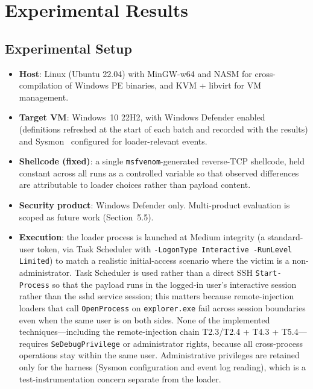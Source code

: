 \section{Experimental Results}

\subsection{Experimental Setup}

\begin{itemize}[leftmargin=*, itemsep=1pt]
    \item \textbf{Host}: Linux (Ubuntu 22.04) with MinGW-w64 and NASM for cross-compilation of Windows PE binaries, and KVM + libvirt for VM management.
    \item \textbf{Target VM}: Windows~10 22H2, with Windows Defender enabled (definitions refreshed at the start of each batch and recorded with the results) and Sysmon~\cite{sysmon} configured for loader-relevant events.
    \item \textbf{Shellcode (fixed)}: a single \texttt{msfvenom}-generated reverse-TCP shellcode, held constant across all runs as a controlled variable so that observed differences are attributable to loader choices rather than payload content.
    \item \textbf{Security product}: Windows Defender only. Multi-product evaluation is scoped as future work (Section~5.5).
    \item \textbf{Execution}: the loader process is launched at Medium integrity (a standard-user token, via Task Scheduler with \texttt{-LogonType Interactive -RunLevel Limited}) to match a realistic initial-access scenario where the victim is a non-administrator. Task Scheduler is used rather than a direct SSH \texttt{Start-Process} so that the payload runs in the logged-in user's interactive session rather than the sshd service session; this matters because remote-injection loaders that call \texttt{OpenProcess} on \texttt{explorer.exe} fail across session boundaries even when the same user is on both sides. None of the implemented techniques---including the remote-injection chain T2.3/T2.4 + T4.3 + T5.4---requires \texttt{SeDebugPrivilege} or administrator rights, because all cross-process operations stay within the same user. Administrative privileges are retained only for the harness (Sysmon configuration and event log reading), which is a test-instrumentation concern separate from the loader.

\end{itemize}
